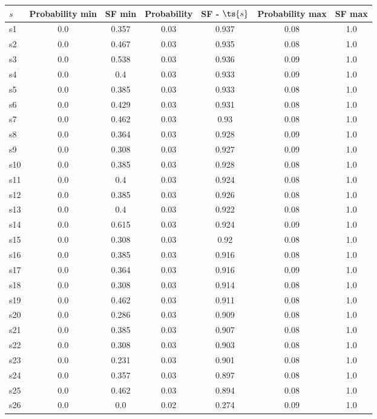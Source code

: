 \documentclass{article}
\begin{document}
\noindent\begin{tabular}{|l|c|c|c|c|c|c|}
\hline
$s$& Probability min & SF min & Probability & SF - $\ts{s}$ & Probability max & SF max\\
\hline
s1 &0.0 & 0.357 & 0.03 & 0.937 & 0.08 & 1.0\\
\hline
s2 &0.0 & 0.467 & 0.03 & 0.935 & 0.08 & 1.0\\
\hline
s3 &0.0 & 0.538 & 0.03 & 0.936 & 0.09 & 1.0\\
\hline
s4 &0.0 & 0.4 & 0.03 & 0.933 & 0.09 & 1.0\\
\hline
s5 &0.0 & 0.385 & 0.03 & 0.933 & 0.08 & 1.0\\
\hline
s6 &0.0 & 0.429 & 0.03 & 0.931 & 0.08 & 1.0\\
\hline
s7 &0.0 & 0.462 & 0.03 & 0.93 & 0.08 & 1.0\\
\hline
s8 &0.0 & 0.364 & 0.03 & 0.928 & 0.09 & 1.0\\
\hline
s9 &0.0 & 0.308 & 0.03 & 0.927 & 0.09 & 1.0\\
\hline
s10 &0.0 & 0.385 & 0.03 & 0.928 & 0.08 & 1.0\\
\hline
s11 &0.0 & 0.4 & 0.03 & 0.924 & 0.08 & 1.0\\
\hline
s12 &0.0 & 0.385 & 0.03 & 0.926 & 0.08 & 1.0\\
\hline
s13 &0.0 & 0.4 & 0.03 & 0.922 & 0.08 & 1.0\\
\hline
s14 &0.0 & 0.615 & 0.03 & 0.924 & 0.09 & 1.0\\
\hline
s15 &0.0 & 0.308 & 0.03 & 0.92 & 0.08 & 1.0\\
\hline
s16 &0.0 & 0.385 & 0.03 & 0.916 & 0.08 & 1.0\\
\hline
s17 &0.0 & 0.364 & 0.03 & 0.916 & 0.09 & 1.0\\
\hline
s18 &0.0 & 0.308 & 0.03 & 0.914 & 0.08 & 1.0\\
\hline
s19 &0.0 & 0.462 & 0.03 & 0.911 & 0.08 & 1.0\\
\hline
s20 &0.0 & 0.286 & 0.03 & 0.909 & 0.08 & 1.0\\
\hline
s21 &0.0 & 0.385 & 0.03 & 0.907 & 0.08 & 1.0\\
\hline
s22 &0.0 & 0.308 & 0.03 & 0.903 & 0.08 & 1.0\\
\hline
s23 &0.0 & 0.231 & 0.03 & 0.901 & 0.08 & 1.0\\
\hline
s24 &0.0 & 0.357 & 0.03 & 0.897 & 0.08 & 1.0\\
\hline
s25 &0.0 & 0.462 & 0.03 & 0.894 & 0.08 & 1.0\\
\hline
s26 &0.0 & 0.0 & 0.02 & 0.274 & 0.09 & 1.0\\

\end{tabular}
\end{document}
